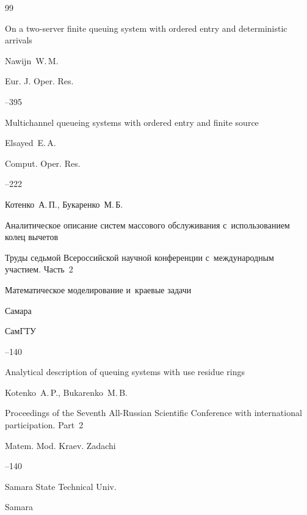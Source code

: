 \begin{thebibliography}{99}

\paper On a two-server finite queuing system with ordered entry and deterministic arrivals 

\by    Nawijn~W.\,M.

\jour Eur. J. Oper. Res. 




--395




\paper Multichannel queueing systems with ordered entry and finite source 

\by    Elsayed~E.\,A.

\jour Comput. Oper. Res.




--222




\by Котенко~А.\,П., Букаренко~М.\,Б.

\paper Аналитическое описание систем массового обслуживания с~использованием колец вычетов

\inbook Труды седьмой Всероссийской научной конференции с~международным участием. \rm Часть~2

\serial Математическое моделирование и~краевые задачи

\publaddr Самара

\publ СамГТУ


--140

\misctransl

\paper Analytical description of queuing systems with use residue rings

\by  Kotenko~A.\,P., Bukarenko~M.\,B.

\inbook Proceedings of the Seventh All-Russian Scientific Conference with international participation. \rm Part~2

\serial Matem. Mod. Kraev. Zadachi


--140

\publ Samara State Technical Univ.

\publaddr Samara






\end{thebibliography}
